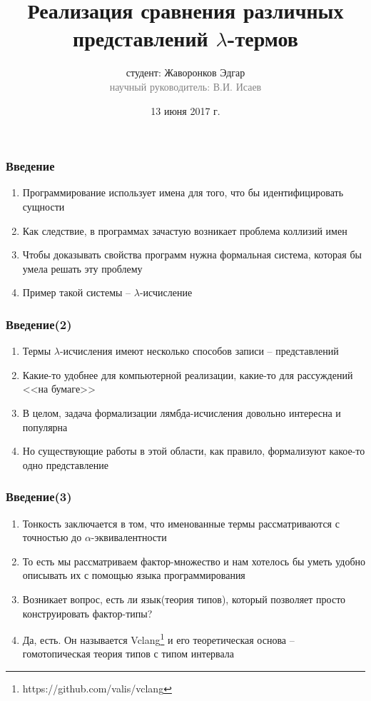 \documentclass{beamer}
\begin{document}
\title[СПб АУ НОЦНТ РАН]{Реализация сравнения различных представлений \texorpdfstring{$\lambda$}{лямбда}-термов}
\author[Жаворонков Э.А.]{студент: Жаворонков Эдгар\\{\footnotesize\textcolor{gray}{научный руководитель: В.И. Исаев}}}
\date{13 июня 2017 г.}

\frame{\titlepage}

\begin{frame}\frametitle{Введение}
    \begin{enumerate}
        \item Программирование использует имена для того, что бы идентифицировать сущности
        \item Как следствие, в программах зачастую возникает проблема коллизий имен
        \item Чтобы доказывать свойства программ нужна формальная система, которая бы умела решать эту проблему
        \item Пример такой системы -- $\lambda$-исчисление
    \end{enumerate}
\end{frame}


\begin{frame}\frametitle{Введение(2)}
    \begin{enumerate}
        \item Термы $\lambda$-исчисления имеют несколько способов записи -- представлений
        \item Какие-то удобнее для компьютерной реализации, какие-то для рассуждений <<на бумаге>>
        \item В целом, задача формализации лямбда-исчисления довольно интересна и популярна
        \item Но существующие работы в этой области, как правило, формализуют какое-то одно представление
    \end{enumerate}
\end{frame}


\begin{frame}\frametitle{Введение(3)}
    \begin{enumerate}
        \item Тонкость заключается в том, что именованные термы рассматриваются с точностью до $\alpha$-эквивалентности
        \item То есть мы рассматриваем фактор-множество и нам хотелось бы уметь удобно описывать их с помощью языка программирования
        \item Возникает вопрос, есть ли язык(теория типов), который позволяет просто конструировать фактор-типы?
        \item <2-> Да, есть. Он называется Vclang\footnote{https://github.com/valis/vclang} и его теоретическая основа -- гомотопическая теория типов с типом интервала
    \end{enumerate}
\end{frame}
\end{document}
